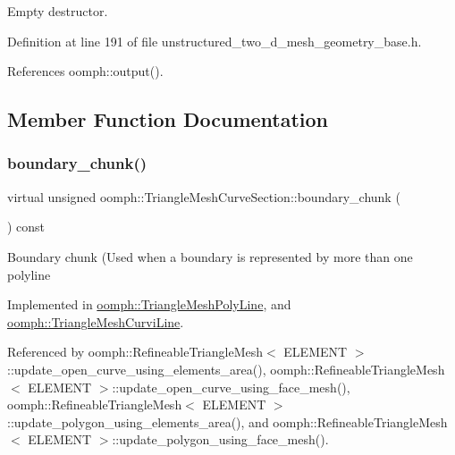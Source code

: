 Empty destructor. 



Definition at line 191 of file unstructured\+\_\+two\+\_\+d\+\_\+mesh\+\_\+geometry\+\_\+base.\+h.



References oomph\+::output().



\subsection{Member Function Documentation}
\mbox{\label{classoomph_1_1TriangleMeshCurveSection_a106d1f0e203e8e17c8296419be284c16}} 
\subsubsection{\texorpdfstring{boundary\+\_\+chunk()}{boundary\_chunk()}}
{\footnotesize\ttfamily virtual unsigned oomph\+::\+Triangle\+Mesh\+Curve\+Section\+::boundary\+\_\+chunk (\begin{DoxyParamCaption}{ }\end{DoxyParamCaption}) const\hspace{0.3cm}{\ttfamily [pure virtual]}}

Boundary chunk (Used when a boundary is represented by more than one polyline 

Implemented in \hyperlink{classoomph_1_1TriangleMeshPolyLine_a4535773043c6b9516b81df42468294c1}{oomph\+::\+Triangle\+Mesh\+Poly\+Line}, and \hyperlink{classoomph_1_1TriangleMeshCurviLine_a42b8ef1fb0ad0078413d0fedc87af679}{oomph\+::\+Triangle\+Mesh\+Curvi\+Line}.



Referenced by oomph\+::\+Refineable\+Triangle\+Mesh$<$ E\+L\+E\+M\+E\+N\+T $>$\+::update\+\_\+open\+\_\+curve\+\_\+using\+\_\+elements\+\_\+area(), oomph\+::\+Refineable\+Triangle\+Mesh$<$ E\+L\+E\+M\+E\+N\+T $>$\+::update\+\_\+open\+\_\+curve\+\_\+using\+\_\+face\+\_\+mesh(), oomph\+::\+Refineable\+Triangle\+Mesh$<$ E\+L\+E\+M\+E\+N\+T $>$\+::update\+\_\+polygon\+\_\+using\+\_\+elements\+\_\+area(), and oomph\+::\+Refineable\+Triangle\+Mesh$<$ E\+L\+E\+M\+E\+N\+T $>$\+::update\+\_\+polygon\+\_\+using\+\_\+face\+\_\+mesh().

